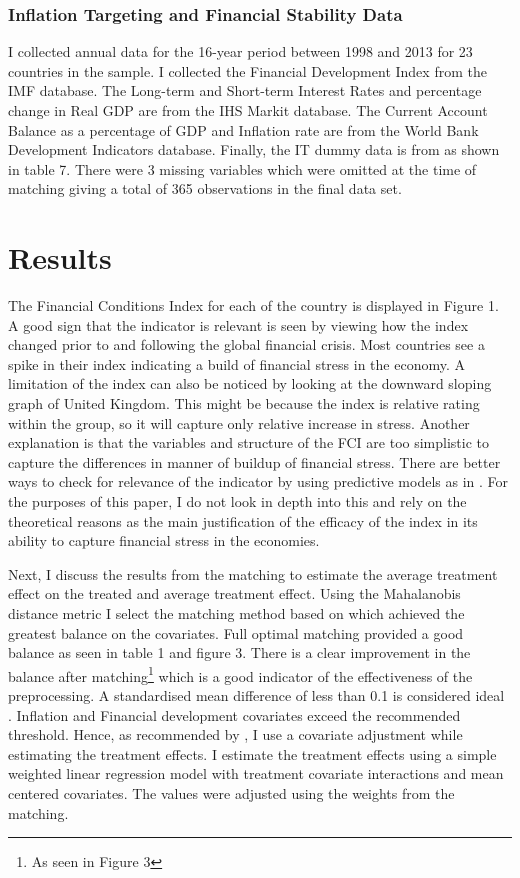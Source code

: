 \documentclass[12pt]{article}
\begin{document}
\subsubsection{Inflation Targeting and Financial Stability Data}

I collected annual data for the 16-year period between 1998 and 2013 for 23 countries in the sample.  I collected the Financial Development Index from the IMF database.  The Long-term and Short-term Interest Rates and percentage change in Real GDP are from the IHS Markit database. The Current Account Balance as a percentage of GDP and Inflation rate are from the World Bank Development Indicators database.  Finally, the IT dummy data is from \cite{RN9,RN2} as shown in table 7.
There were 3 missing variables which were omitted at the time of matching giving a total of 365 observations in the final data set.  


\section{Results}
The Financial Conditions Index for each of the country is displayed in Figure 1. A good sign that the indicator is relevant is seen by viewing how the index changed prior to and following the global financial crisis. Most countries see a spike in their index indicating a build of financial stress in the economy.  A limitation of the index can also be noticed by looking at the downward sloping graph of United Kingdom. This might be because the index is relative rating within the group, so it will capture only relative increase in stress. Another explanation is that the variables and structure of the FCI are too simplistic to capture the differences in manner of buildup of financial stress. There are better ways to check for relevance of the indicator by using predictive models as in \cite{RN35}. For the purposes of this paper, I do not look in depth into this and rely on the theoretical reasons as the main justification of the efficacy of the index in its ability to capture financial stress in the economies.

Next, I discuss the results from the matching to estimate the average treatment effect on the treated and average treatment effect.
Using the Mahalanobis distance metric I select the matching method based on which achieved the greatest balance on the covariates. Full optimal matching provided a good balance as seen in table 1 and figure 3.  There is a clear improvement in the balance after matching\footnote{As seen in Figure 3} which is a good indicator of the effectiveness of the preprocessing. 
A standardised mean difference of less than 0.1 is considered ideal \citep{matchit}.  Inflation and Financial development covariates exceed the recommended threshold. Hence, as recommended by \cite{matchit}, I use a covariate adjustment while estimating the treatment effects. I estimate the treatment effects using a simple weighted linear regression model with treatment covariate interactions and mean centered covariates. The values were adjusted using the weights from the matching. 
\end{document}
